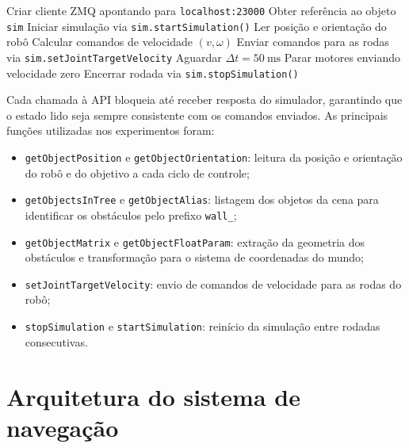 \begin{algorithm}[H]
\caption{Padrão de comunicação com o CoppeliaSim}
\label{alg:comunicacao_zmq}
\begin{algorithmic}[1]
\State Criar cliente ZMQ apontando para \texttt{localhost:23000}
\State Obter referência ao objeto \texttt{sim}
\State Iniciar simulação via \texttt{sim.startSimulation()}
\Repeat
    \State Ler posição e orientação do robô
    \State Calcular comandos de velocidade $(v,\omega)$
    \State Enviar comandos para as rodas via \texttt{sim.setJointTargetVelocity}
    \State Aguardar $\Delta t = 50~\text{ms}$
\State Parar motores enviando velocidade zero
\State Encerrar rodada via \texttt{sim.stopSimulation()}
\end{algorithmic}
\end{algorithm}

Cada chamada à API bloqueia até receber resposta do simulador, garantindo que o estado lido seja sempre consistente com os comandos enviados. As principais funções utilizadas nos experimentos foram:

\begin{itemize}
    \item \texttt{getObjectPosition} e \texttt{getObjectOrientation}: leitura da posição e orientação do robô e do objetivo a cada ciclo de controle;

    \item \texttt{getObjectsInTree} e \texttt{getObjectAlias}: listagem dos objetos da cena para identificar os obstáculos pelo prefixo \texttt{wall\_};

    \item \texttt{getObjectMatrix} e \texttt{getObjectFloatParam}: extração da geometria dos obstáculos e transformação para o sistema de coordenadas do mundo;

    \item \texttt{setJointTargetVelocity}: envio de comandos de velocidade para as rodas do robô;

    \item \texttt{stopSimulation} e \texttt{startSimulation}: reinício da simulação entre rodadas consecutivas.
\end{itemize}

\section{Arquitetura do sistema de navegação}
\label{sec:arquitetura_sistema}

